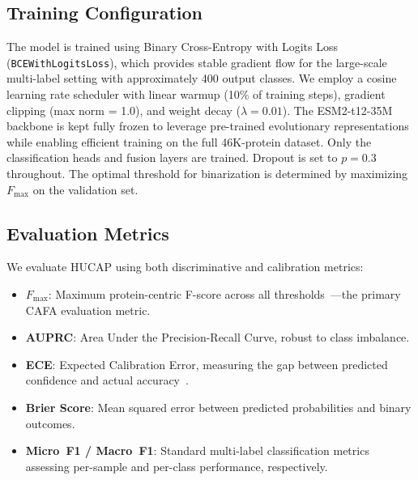 \documentclass[conference]{IEEEtran}
\begin{document}
\subsection{Training Configuration}
The model is trained using Binary Cross-Entropy with Logits Loss (\texttt{BCEWithLogitsLoss}), which provides stable gradient flow for the large-scale multi-label setting with approximately 400 output classes. We employ a cosine learning rate scheduler with linear warmup (10\% of training steps), gradient clipping (max norm = 1.0), and weight decay ($\lambda = 0.01$). The ESM2-t12-35M backbone is kept fully frozen to leverage pre-trained evolutionary representations while enabling efficient training on the full 46K-protein dataset. Only the classification heads and fusion layers are trained. Dropout is set to $p = 0.3$ throughout. The optimal threshold for binarization is determined by maximizing $F_{\max}$ on the validation set.

\subsection{Evaluation Metrics}
We evaluate HUCAP using both discriminative and calibration metrics:

\begin{itemize}
    \item \textbf{$F_{\max}$}: Maximum protein-centric F-score across all thresholds~\cite{radivojac2013}---the primary CAFA evaluation metric.
    \item \textbf{AUPRC}: Area Under the Precision-Recall Curve, robust to class imbalance.
    \item \textbf{ECE}: Expected Calibration Error, measuring the gap between predicted confidence and actual accuracy~\cite{guo2017}.
    \item \textbf{Brier Score}: Mean squared error between predicted probabilities and binary outcomes.
    \item \textbf{Micro~F1 / Macro~F1}: Standard multi-label classification metrics assessing per-sample and per-class performance, respectively.
\end{itemize}
\end{document}
